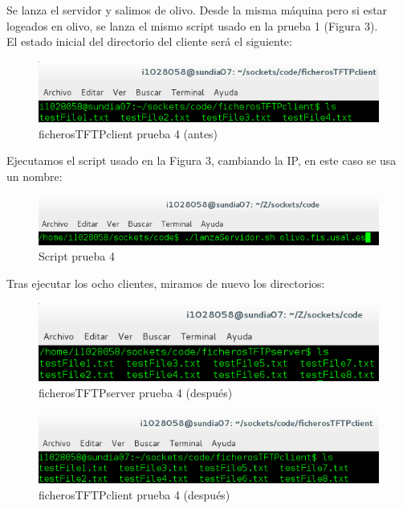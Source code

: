 \documentclass[journal, a4paper]{IEEEtran}
\begin{document}
Se lanza el servidor y salimos de olivo. Desde la misma máquina pero si estar logeados en olivo, se lanza el mismo script usado en la prueba 1 (Figura 3).\\

El estado inicial del directorio del cliente será el siguiente:

\begin{figure}[H]
\centering
\includegraphics[scale=0.45]{images/client_before_4}
\caption{ficherosTFTPclient prueba 4 (antes)}
\end{figure}

Ejecutamos el script usado en la Figura 3, cambiando la IP, en este caso se usa un nombre:

\begin{figure}[H]
\centering
\includegraphics[scale=0.42]{images/script_prueba_4}
\caption{Script prueba 4}
\end{figure}

Tras ejecutar los ocho clientes, miramos de nuevo los directorios:

\begin{figure}[H]
\centering
\includegraphics[scale=0.45]{images/server_after_4}
\caption{ficherosTFTPserver prueba 4 (después)}
\end{figure}

\begin{figure}[H]
\centering
\includegraphics[scale=0.45]{images/client_after_4}
\caption{ficherosTFTPclient prueba 4 (después)}
\end{figure}
\end{document}
